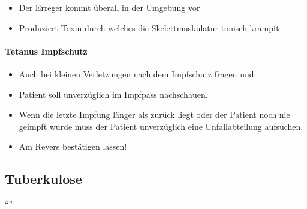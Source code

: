 \emph{}


\begin{itemize}
    \item Der Erreger kommt \"uberall in der Umgebung vor
    \item Produziert Toxin durch welches die Skelettmuskulatur tonisch
    krampft
\end{itemize}

\paragraph{Tetanus Impfschutz}

\begin{itemize}
    \item Auch bei kleinen Verletzungen nach dem Impfschutz fragen und
    \item Patient soll unverz\"uglich im Impfpass nachschauen.
    \item Wenn die letzte Impfung l\"anger als 
    zur\"uck liegt oder der Patient noch nie geimpft wurde muss der Patient unverz\"uglich eine
    Unfallabteilung aufsuchen.
    \item Am Revers best\"atigen lassen!
\end{itemize}



\subsection{Tuberkulose}

"`"'

